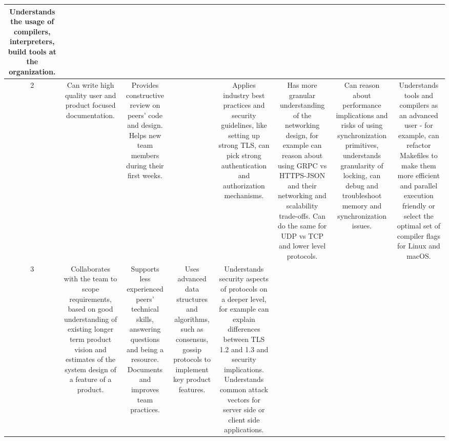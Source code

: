 \documentclass{article}
\begin{document}
{\begin{tabular}{|C|C|C|C|C|C|C|C|}
    Understands the usage of compilers, interpreters, build tools at the organization.
    \\ [13em]
  \hline
    2
    &

    Can write high quality user and product focused documentation.
    &

    Provides constructive review on peers' code and design. Helps new team
    members during their first weeks.
    &

    &

    Applies industry best practices and security guidelines, like setting up
    strong TLS, can pick strong authentication and authorization mechanisms.
    &

    Has more granular understanding of the networking design, for example can
    reason about using GRPC vs HTTPS-JSON and their networking and scalability
    trade-offs. Can do the same for UDP vs TCP and lower level protocols.
    &

    Can reason about performance implications and risks of using
    synchronization primitives, understands granularity of locking, can debug and
    troubleshoot memory and synchronization issues.
    &

    Understands tools and compilers as an advanced user - for example, can
    refactor Makefiles to make them more efficient and parallel execution friendly
    or select the optimal set of compiler flags for Linux and macOS.
    \\ [13em]
  \hline
    3
    &

    Collaborates with the team to scope requirements, based on good
    understanding of existing longer term product vision and estimates of the
    system design of a feature of a product.
    &

    Supports less experienced peers' technical skills, answering questions and
    being a resource. Documents and improves team practices.
    &

    Uses advanced data structures and algorithms, such as consensus, gossip
    protocols to implement key product features.
    &

    Understands security aspects of protocols on a deeper level, for example
    can explain differences between TLS 1.2 and 1.3 and security implications.
    Understands common attack vectors for server side or client side applications.


\end{tabular}}
\end{document}

